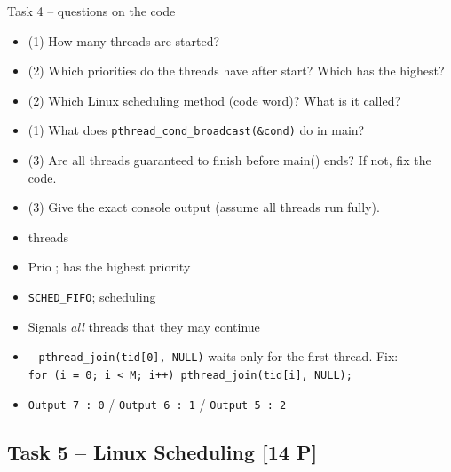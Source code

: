 \begin{example2}{Task 4 -- questions on the code}
    \begin{itemize}
        \item {} (1) How many threads are started?
        \item {} (2) Which priorities do the threads have after start?
              Which has the highest?
        \item {} (2) Which Linux scheduling method (code word)? What is it called?
        \item {} (1) What does \texttt{pthread\_cond\_broadcast(\&cond)} do in main?
        \item {} (3) Are all threads guaranteed to finish before main()
              ends? If not, fix the code.
        \item {} (3) Give the exact console output (assume all threads run
              fully).
    \end{itemize}
    \tcblower
    \begin{itemize}
        \item {}  threads
        \item {} Prio ;  has the highest priority
        \item {} \texttt{SCHED\_FIFO};  scheduling
        \item {} Signals \emph{all} threads that they may continue
        \item {}  -- \texttt{pthread\_join(tid[0], NULL)} waits
              only for the first thread. Fix:\\
              \texttt{for (i = 0; i < M; i++) pthread\_join(tid[i], NULL);}
        \item {} \texttt{Output 7 : 0} / \texttt{Output 6 : 1} / \texttt{Output 5 : 2}
    \end{itemize}
\end{example2}

\raggedcolumns
\columnbreak

\subsection{Task 5 -- Linux Scheduling [14 P]}

